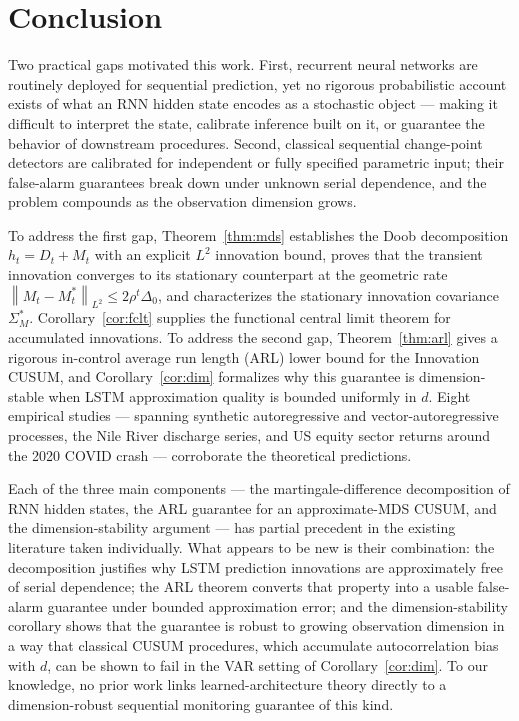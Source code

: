\documentclass[bj,authoryear]{imsart}
\theoremstyle{plain}
\theoremstyle{definition}
\newcommand{\norm}[1]{\left\lVert #1 \right\rVert}
\begin{document}
\section{Conclusion}
\label{sec:conclusion}

Two practical gaps motivated this work.
First, recurrent neural networks are routinely deployed for sequential prediction,
yet no rigorous probabilistic account exists of what an RNN hidden state
encodes as a stochastic object --- making it difficult to interpret the state,
calibrate inference built on it, or guarantee the behavior of downstream
procedures.
Second, classical sequential change-point detectors are calibrated for
independent or fully specified parametric input; their false-alarm guarantees
break down under unknown serial dependence, and the problem compounds as the
observation dimension grows.

To address the first gap, Theorem~\ref{thm:mds} establishes the Doob
decomposition $h_t=D_t+M_t$ with an explicit $L^2$ innovation bound,
proves that the transient innovation converges to its stationary counterpart
at the geometric rate $\norm{M_t-M_t^*}_{L^2}\leq 2\rho^t\Delta_0$,
and characterizes the stationary innovation covariance $\Sigma_M^*$.
Corollary~\ref{cor:fclt} supplies the functional central limit theorem for
accumulated innovations.
To address the second gap, Theorem~\ref{thm:arl} gives a rigorous
in-control average run length (ARL) lower bound for the Innovation CUSUM,
and Corollary~\ref{cor:dim} formalizes why this guarantee is dimension-stable
when LSTM approximation quality is bounded uniformly in $d$.
Eight empirical studies --- spanning synthetic autoregressive and
vector-autoregressive processes, the Nile River discharge series, and
US equity sector returns around the 2020 COVID crash --- corroborate the
theoretical predictions.

Each of the three main components --- the martingale-difference decomposition
of RNN hidden states, the ARL guarantee for an approximate-MDS CUSUM, and the
dimension-stability argument --- has partial precedent in the existing
literature taken individually.
What appears to be new is their combination: the decomposition justifies why
LSTM prediction innovations are approximately free of serial dependence; the
ARL theorem converts that property into a usable false-alarm guarantee under
bounded approximation error; and the dimension-stability corollary shows that
the guarantee is robust to growing observation dimension in a way that
classical CUSUM procedures, which accumulate autocorrelation bias with $d$,
can be shown to fail in the VAR setting of Corollary~\ref{cor:dim}.
To our knowledge, no prior work links learned-architecture theory directly to
a dimension-robust sequential monitoring guarantee of this kind.
\end{document}

